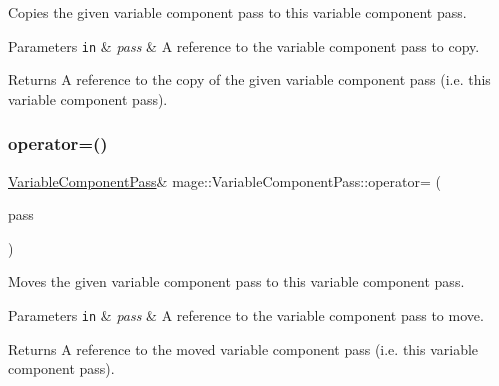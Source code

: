 Copies the given variable component pass to this variable component pass.


\begin{DoxyParams}[1]{Parameters}
\mbox{\tt in}  & {\em pass} & A reference to the variable component pass to copy. \\
\hline
\end{DoxyParams}
\begin{DoxyReturn}{Returns}
A reference to the copy of the given variable component pass (i.\+e. this variable component pass). 
\end{DoxyReturn}
\hypertarget{classmage_1_1_variable_component_pass_a6d165ef4a6e1cb43035fd6a14197b542}{}\label{classmage_1_1_variable_component_pass_a6d165ef4a6e1cb43035fd6a14197b542} 
\subsubsection{\texorpdfstring{operator=()}{operator=()}\hspace{0.1cm}{\footnotesize\ttfamily [2/2]}}
{\footnotesize\ttfamily \hyperlink{classmage_1_1_variable_component_pass}{Variable\+Component\+Pass}\& mage\+::\+Variable\+Component\+Pass\+::operator= (\begin{DoxyParamCaption}\item[{\hyperlink{classmage_1_1_variable_component_pass}{Variable\+Component\+Pass} \&\&}]{pass }\end{DoxyParamCaption})\hspace{0.3cm}{\ttfamily [delete]}}

Moves the given variable component pass to this variable component pass.


\begin{DoxyParams}[1]{Parameters}
\mbox{\tt in}  & {\em pass} & A reference to the variable component pass to move. \\
\hline
\end{DoxyParams}
\begin{DoxyReturn}{Returns}
A reference to the moved variable component pass (i.\+e. this variable component pass). 
\end{DoxyReturn}
\hypertarget{classmage_1_1_variable_component_pass_aa77a1793a8b6e617f25473d98681a58f}{}\label{classmage_1_1_variable_component_pass_aa77a1793a8b6e617f25473d98681a58f} 
